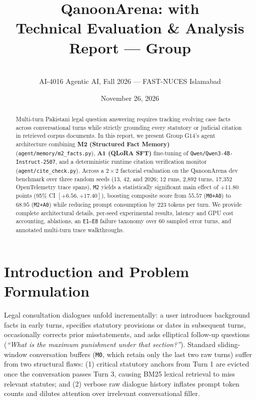 \documentclass[11pt]{article}
\title{\textbf{QanoonArena: \memtype{} with \traintype{}}\\[4pt]\large Technical Evaluation \& Analysis Report --- Group \groupid{}}
\author{\members\\AI-4016 Agentic AI, Fall 2026 --- FAST-NUCES Islamabad}
\date{November 26, 2026}
\newcommand{\groupid}{G14}
\newcommand{\memtype}{M2 (Structured Fact Memory)}
\newcommand{\traintype}{A1 (QLoRA SFT)}
\begin{document}
\maketitle

\begin{abstract}
Multi-turn Pakistani legal question answering requires tracking evolving case facts across conversational turns while strictly grounding every statutory or judicial citation in retrieved corpus documents. In this report, we present Group \groupid{}'s agent architecture combining \textbf{\memtype{}} (\texttt{agent/memory/m2\_facts.py}), \textbf{\traintype{}} fine-tuning of \texttt{Qwen/Qwen3-4B-Instruct-2507}, and a deterministic runtime citation verification monitor (\texttt{agent/cite\_check.py}). Across a $2\times 2$ factorial evaluation on the QanoonArena dev benchmark over three random seeds (13, 42, and 2026; 12 runs, 2,892 turns, 17,352 OpenTelemetry trace spans), \texttt{M2} yields a statistically significant main effect of $+11.80$ points (95\% CI $[+6.56, +17.40]$), boosting composite score from $55.57$ (\texttt{M0+A0}) to $68.95$ (\texttt{M2+A0}) while reducing prompt consumption by $223$ tokens per turn. We provide complete architectural details, per-seed experimental results, latency and GPU cost accounting, ablations, an \texttt{E1--E8} failure taxonomy over 60 sampled error turns, and annotated multi-turn trace walkthroughs.
\end{abstract}

\section{Introduction and Problem Formulation}
\label{sec:\groupid-intro}
Legal consultation dialogues unfold incrementally: a user introduces background facts in early turns, specifies statutory provisions or dates in subsequent turns, occasionally corrects prior misstatements, and asks elliptical follow-up questions (\emph{``What is the maximum punishment under that section?''}). Standard sliding-window conversation buffers (\texttt{M0}, which retain only the last two raw turns) suffer from two structural flaws: (1) critical statutory anchors from Turn 1 are evicted once the conversation passes Turn 3, causing BM25 lexical retrieval to miss relevant statutes; and (2) verbose raw dialogue history inflates prompt token counts and dilutes attention over irrelevant conversational filler.
\end{document}
